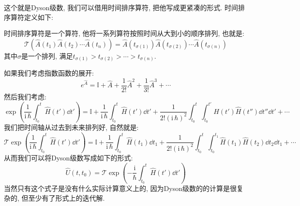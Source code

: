 这个就是Dyson级数, 我们可以借用时间排序算符, 把他写成更紧凑的形式.
时间排序算符定义如下:
\begin{definition}[][时间排序算符]
  时间排序算符是一个算符, 他将一系列算符按照时间从大到小的顺序排列, 也就是:
  \begin{equation}
    \mathcal{T} \left( \hat{A}(t_1) \hat{A}(t_2) \cdots \hat{A}(t_n) \right) = \hat{A}(t_{\sigma(1)}) \hat{A}(t_{\sigma(2)}) \cdots \hat{A}(t_{\sigma(n)})
  \end{equation}
  其中$\sigma$是一个排列, 满足$t_{\sigma(1)} > t_{\sigma(2)} > \cdots > t_{\sigma(n)}$.
\end{definition}
如果我们考虑指数函数的展开:
\begin{equation}
  e^{\hat{A}} = \mathbb{I} + \hat{A} + \frac{1}{2!} \hat{A}^2 + \frac{1}{3!} \hat{A}^3 + \cdots
\end{equation}
然后我们考虑:
\begin{equation}
  \exp(\frac{1}{\mathrm{i}\,\hbar} \int_{t_0}^{t} \hat{H}(t') \dd{t'}) = \mathbb{I} + \frac{1}{\mathrm{i}\,\hbar} \int_{t_0}^{t} \hat{H}(t') \dd{t'} + \frac{1}{2! (\mathrm{i}\,\hbar)^2} \int_{t_0}^{t} \int_{t_0}^{t'} \hat{H}(t') \hat{H}(t'') \dd{t''} \dd{t'} + \cdots
\end{equation}
我们把时间轴从过去到未来排列好, 自然就是:
\begin{equation}
  \mathcal{T} \exp(\frac{1}{\mathrm{i}\,\hbar} \int_{t_0}^{t} \hat{H}(t') \dd{t'}) = \mathbb{I} + \frac{1}{\mathrm{i}\,\hbar} \int_{t_0}^{t} \hat{H}(t_1) \dd{t_1} + \frac{1}{2! (\mathrm{i}\,\hbar)^2} \int_{t_0}^{t} \int_{t_0}^{t_1} \hat{H}(t_1) \hat{H}(t_2) \dd{t_2} \dd{t_1} + \cdots
\end{equation}
从而我们可以将Dyson级数写成如下的形式:
\begin{equation}
  \hat{U}(t,t_0) = \mathcal{T} \exp\left( -\frac{\mathrm{i}}{\hbar} \int_{t_0}^{t} \hat{H}(t') \dd{t'} \right)
\end{equation}
当然只有这个式子是没有什么实际计算意义上的, 因为Dyson级数的的计算是很复杂的, 但至少有了形式上的迭代解.



